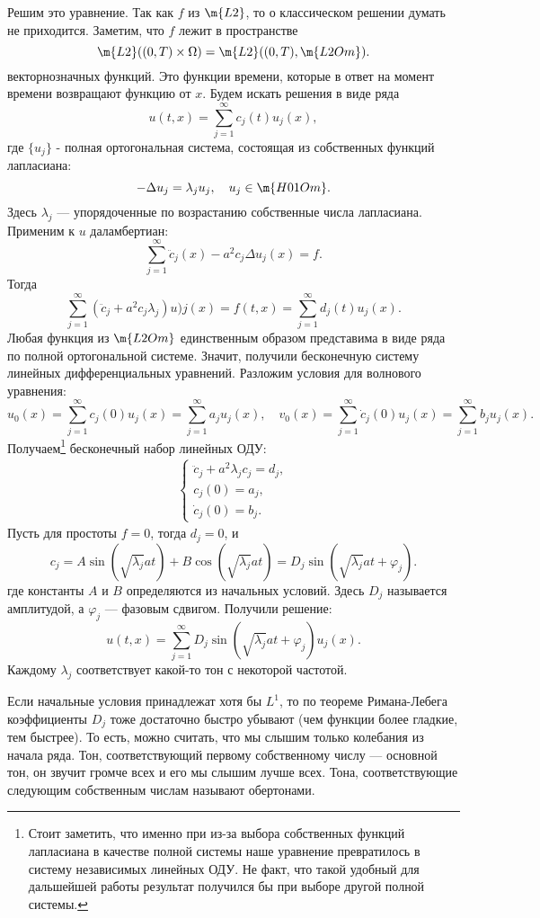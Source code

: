 Решим это уравнение. Так как $f$ из $\m{L2}$, то о классическом решении думать не приходится. Заметим, что $f$ лежит в пространстве
$$ \m{L2}((0,T) \times \Omega) = \m{L2}((0,T) , \m{L2Om}).$$
векторнозначных функций. Это функции времени, которые в ответ на момент времени возвращают функцию от $x$. Будем искать решения в виде ряда
$$ u(t,x) = \sum_{j=1}^\infty c_j (t) u_j(x),$$
где $\{ u_j \}$ - полная ортогональная система, состоящая из собственных функций лапласиана:
$$ - \Delta u_j = \lambda_j u_j, \quad u_j \in \m{H01Om}.$$
Здесь ${\lambda_j}$ --- упорядоченные по возрастанию собственные числа лапласиана. Применим к $u$ даламбертиан:
$$ \sum_{j=1}^\infty \ddot{c}_j(x) - a^2 c_j \Delta u_j(x) = f.$$
Тогда
$$ \sum_{j=1}^\infty \left( \ddot{c}_j + a^2 c_j \lambda_j \right) u)j(x) = f (t,x) = \sum_{j=1}^\infty d_j(t) u_j(x).$$
Любая функция из $\m{L2Om}$ единственным образом представима в виде ряда по полной ортогональной системе. Значит, получили бесконечную систему линейных дифференциальных уравнений. Разложим условия для волнового уравнения:
$$ u_0(x) = \sum_{j=1}^\infty c_j(0) u_j(x) = \sum_{j=1}^\infty a_j u_j(x), \quad  v_0(x) = \sum_{j=1}^\infty \dot{c}_j(0) u_j(x) = \sum_{j=1}^\infty b_j u_j(x).$$
Получаем\footnote{Стоит заметить, что именно при из-за выбора собственных функций лапласиана в качестве полной системы наше уравнение превратилось в систему независимых линейных ОДУ. Не факт, что такой удобный для дальшейшей работы результат получился бы при выборе другой полной системы.} бесконечный набор линейных ОДУ: 
\begin{align*}
	\begin{cases*}
		\ddot{c}_j + a^2 \lambda_j c_j = d_j,\\
		c_j(0) = a_j,\\
		\dot{c}_j(0) = b_j.
	\end{cases*}
\end{align*}
Пусть для простоты $f = 0$, тогда $d_j = 0$, и
$$ c_j = A \sin (\sqrt{\lambda_j} a t) + B \cos (\sqrt{\lambda_j} a t) = D_j \sin (\sqrt{\lambda_j} at + \varphi_j).$$
где константы $A$ и $B$ определяются из начальных условий. Здесь $D_j$ называется амплитудой, а $\varphi_j$ --- фазовым сдвигом. Получили решение:
$$ u (t,x) = \sum_{j=1}^\infty D_j \sin (\sqrt{\lambda_j} at + \varphi_j) u_j(x).$$
Каждому $\lambda_j$ соответствует какой-то тон с некоторой частотой.

\begin{note}
Если начальные условия принадлежат хотя бы $L^1$, то по теореме Римана-Лебега коэффициенты $D_j$ тоже достаточно быстро убывают (чем функции более гладкие, тем быстрее). То есть, можно считать, что мы слышим только колебания из начала ряда. Тон, соответствующий первому собственному числу --- основной тон, он звучит громче всех и его мы слышим лучше всех. Тона, соответствующие следующим собственным числам называют обертонами.
\end{note}


